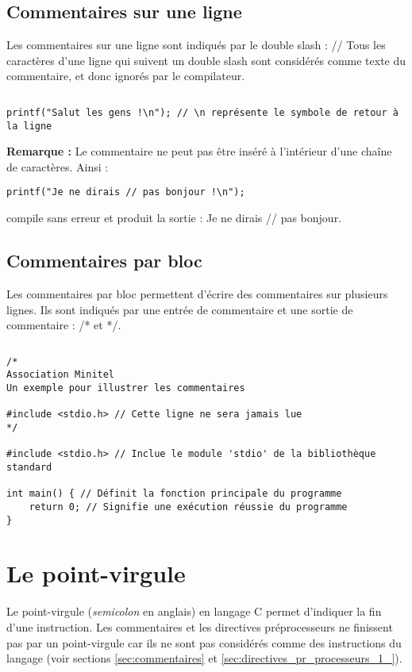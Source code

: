 \documentclass[../../../main.tex]{subfiles}
\begin{document}
\subsection{Commentaires sur une ligne}\label{sub:commentaires_sur_une_ligne}
Les commentaires sur une ligne sont indiqués par le double slash : \textsf{//} \newline
Tous les caractères d'une ligne qui suivent un double slash sont considérés comme texte du commentaire, et donc ignorés par le compilateur.
\begin{lstlisting}[title=Exemple]
\end{lstlisting}
\begin{verbatim}
printf("Salut les gens !\n"); // \n représente le symbole de retour à la ligne
\end{verbatim}
\textbf{Remarque :} Le commentaire ne peut pas être inséré à l'intérieur d'une chaîne de caractères. Ainsi :
\begin{verbatim}
printf("Je ne dirais // pas bonjour !\n");
\end{verbatim}
compile sans erreur et produit la sortie : \textsf{Je ne dirais // pas bonjour}.
\subsection{Commentaires par bloc}\label{sub:commentaires_par_bloc}
Les commentaires par bloc permettent d'écrire des commentaires sur plusieurs lignes. Ils sont indiqués par une entrée de commentaire et une sortie de commentaire : \textsf{/*} et \textsf{*/}.
\begin{lstlisting}[title=Exemple]
\end{lstlisting}
\begin{verbatim}
/*
Association Minitel
Un exemple pour illustrer les commentaires

#include <stdio.h> // Cette ligne ne sera jamais lue
*/

#include <stdio.h> // Inclue le module 'stdio' de la bibliothèque standard

int main() { // Définit la fonction principale du programme
	return 0; // Signifie une exécution réussie du programme
}
\end{verbatim}

\section{Le point-virgule}\label{sec:le_point_virgule}
Le point-virgule (\textit{semicolon} en anglais) en langage C permet d'indiquer la fin d'une instruction. Les commentaires et les directives préprocesseurs ne finissent pas par un point-virgule car ils ne sont pas considérés comme des instructions du langage (voir sections \ref{sec:commentaires} et \ref{sec:directives_pr_processeurs_1_}).
 
\end{document}
